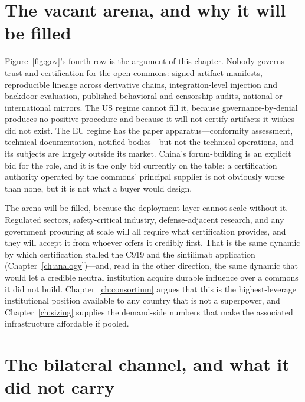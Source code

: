 \section{The vacant arena, and why it will be filled}

Figure~\ref{fig:gov}'s fourth row is the argument of this chapter. Nobody governs trust and certification for the open commons: signed artifact manifests, reproducible lineage across derivative chains, integration-level injection and backdoor evaluation, published behavioral and censorship audits, national or international mirrors. The US regime cannot fill it, because governance-by-denial produces no positive procedure and because it will not certify artifacts it wishes did not exist. The EU regime has the paper apparatus---conformity assessment, technical documentation, notified bodies---but not the technical operations, and its subjects are largely outside its market. China's forum-building is an explicit bid for the role, and it is the only bid currently on the table; a certification authority operated by the commons' principal supplier is not obviously worse than none, but it is not what a buyer would design.

The arena will be filled, because the deployment layer cannot scale without it. Regulated sectors, safety-critical industry, defense-adjacent research, and any government procuring at scale will all require what certification provides, and they will accept it from whoever offers it credibly first. That is the same dynamic by which certification stalled the C919 and the sintilimab application (Chapter~\ref{ch:analogy})---and, read in the other direction, the same dynamic that would let a credible neutral institution acquire durable influence over a commons it did not build. Chapter~\ref{ch:consortium} argues that this is the highest-leverage institutional position available to any country that is not a superpower, and Chapter~\ref{ch:sizing} supplies the demand-side numbers that make the associated infrastructure affordable if pooled.

\section{The bilateral channel, and what it did not carry}
\label{sec:gov-bilateral}

